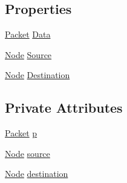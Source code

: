 \subsection*{Properties}
\begin{DoxyCompactItemize}
\item 
\hyperlink{classNetTrafficSimulator_1_1Packet}{Packet} \hyperlink{classNetTrafficSimulator_1_1Link_1_1DataEnvelope_ad3d68bcc1cbf160648beeaca939cbd51}{Data}
\item 
\hyperlink{classNetTrafficSimulator_1_1Node}{Node} \hyperlink{classNetTrafficSimulator_1_1Link_1_1DataEnvelope_a172d3b86ed384f803eabfa751c4f296f}{Source}
\item 
\hyperlink{classNetTrafficSimulator_1_1Node}{Node} \hyperlink{classNetTrafficSimulator_1_1Link_1_1DataEnvelope_af8789d5ec0a0dd7087e33dc532cb0237}{Destination}
\end{DoxyCompactItemize}
\subsection*{Private Attributes}
\begin{DoxyCompactItemize}
\item 
\hyperlink{classNetTrafficSimulator_1_1Packet}{Packet} \hyperlink{classNetTrafficSimulator_1_1Link_1_1DataEnvelope_a3c8959eec1aeec3d016cc06c5a01a074}{p}
\item 
\hyperlink{classNetTrafficSimulator_1_1Node}{Node} \hyperlink{classNetTrafficSimulator_1_1Link_1_1DataEnvelope_a9e56896aa5da48e13e8c13cb9efc20f4}{source}
\item 
\hyperlink{classNetTrafficSimulator_1_1Node}{Node} \hyperlink{classNetTrafficSimulator_1_1Link_1_1DataEnvelope_a4c06f49085e916a8e73f54f9c9a148f3}{destination}
\end{DoxyCompactItemize}


